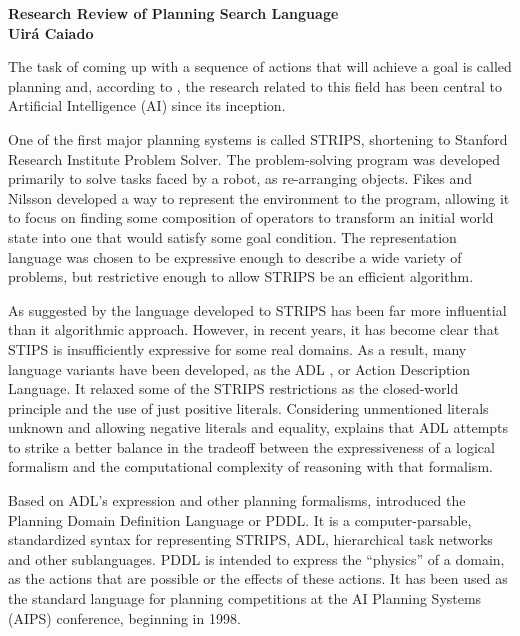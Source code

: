 \documentclass[a4paper]{article}
\begin{document}

\begin{center}

{\bf \large Research Review of Planning Search Language\\ \small Uirá Caiado}
\end{center}




The task of coming up with a sequence of actions that will achieve a goal is called planning and, according to \cite{russelartificial}, the research related to this field has been central to Artificial Intelligence (AI) since its inception.


One of the first major planning systems is called STRIPS, shortening to Stanford Research Institute Problem Solver. The problem-solving program was developed primarily to solve tasks faced by a robot, as re-arranging objects. Fikes and Nilsson \cite{fikes1971strips} developed a way to represent the environment to the program, allowing it to focus on finding some composition of operators to transform an initial world state into one that would satisfy some goal condition. The representation language was chosen to be expressive enough to describe a wide variety of problems, but restrictive enough to allow STRIPS be an efficient algorithm.

As suggested by \cite{russelartificial} the language developed to STRIPS has been far more influential than it algorithmic approach. However, in recent years, it has become clear that STIPS is insufficiently expressive for some real domains. As a result, many language variants have been developed, as the ADL \cite{pednault1986formulating}, or Action Description Language. It relaxed some of the STRIPS restrictions as the closed-world principle and the use of just positive literals. Considering unmentioned literals unknown and allowing negative literals and equality, \cite{pednault1994} explains that ADL attempts to strike a better balance in the tradeoff between the expressiveness of a logical formalism and the computational complexity of reasoning with that formalism.

Based on ADL's expression and other planning formalisms, \cite{Ghallab1998} introduced the Planning Domain Definition Language or PDDL. It is a computer-parsable, standardized syntax for representing STRIPS, ADL, hierarchical task networks and other sublanguages. PDDL is intended to express the “physics” of a domain, as the actions that are possible or the effects of these actions. It has been used as the standard language for planning competitions at the AI Planning Systems (AIPS) conference, beginning in 1998.









\end{document}
